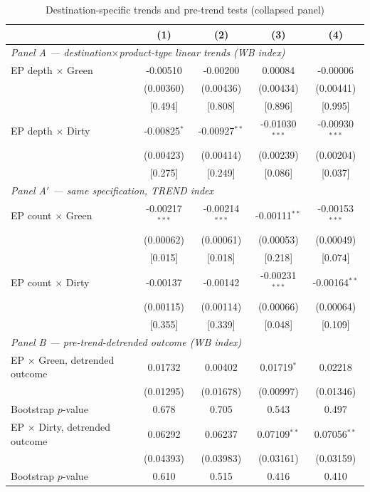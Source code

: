 \begin{table}[p]
\centering
\scriptsize
\caption{Destination-specific trends and pre-trend tests (collapsed panel)}
\label{tab:trends}
\renewcommand{\arraystretch}{0.94}
\begin{threeparttable}
\begin{tabular}{lcccc}
\toprule
 & (1) & (2) & (3) & (4) \\
\midrule
\multicolumn{5}{l}{\textit{Panel A --- destination$\times$product-type linear trends (WB index)}} \\
EP depth $\times$ Green & -0.00510 & -0.00200 & 0.00084 & -0.00006 \\
 & (0.00360) & (0.00436) & (0.00434) & (0.00441) \\
 & [0.494] & [0.808] & [0.896] & [0.995] \\
EP depth $\times$ Dirty & -0.00825$^{*}$ & -0.00927$^{**}$ & -0.01030$^{***}$ & -0.00930$^{***}$ \\
 & (0.00423) & (0.00414) & (0.00239) & (0.00204) \\
 & [0.275] & [0.249] & [0.086] & [0.037] \\
\multicolumn{5}{l}{\textit{Panel A$'$ --- same specification, TREND index}} \\
EP count $\times$ Green & -0.00217$^{***}$ & -0.00214$^{***}$ & -0.00111$^{**}$ & -0.00153$^{***}$ \\
 & (0.00062) & (0.00061) & (0.00053) & (0.00049) \\
 & [0.015] & [0.018] & [0.218] & [0.074] \\
EP count $\times$ Dirty & -0.00137 & -0.00142 & -0.00231$^{***}$ & -0.00164$^{**}$ \\
 & (0.00115) & (0.00114) & (0.00066) & (0.00064) \\
 & [0.355] & [0.339] & [0.048] & [0.109] \\
\multicolumn{5}{l}{\textit{Panel B --- pre-trend-detrended outcome (WB index)}} \\
EP $\times$ Green, detrended outcome & 0.01732 & 0.00402 & 0.01719$^{*}$ & 0.02218 \\
 & (0.01295) & (0.01678) & (0.00997) & (0.01346) \\
\quad Bootstrap $p$-value & 0.678 & 0.705 & 0.543 & 0.497 \\
EP $\times$ Dirty, detrended outcome & 0.06292 & 0.06237 & 0.07109$^{**}$ & 0.07056$^{**}$ \\
 & (0.04393) & (0.03983) & (0.03161) & (0.03159) \\
\quad Bootstrap $p$-value & 0.610 & 0.515 & 0.416 & 0.410 \\

\end{tabular}
\end{threeparttable}
\end{table}
